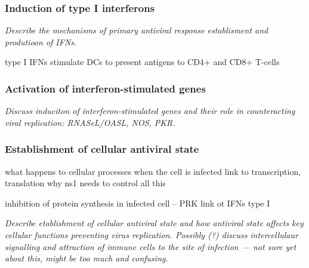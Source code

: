 		\subsubsection{Induction of type I interferons}
		
		\textit{Describe the mechanisms of primary antiviral response establisment and produtioon of IFNs.}
		
		type I IFNs stimulate DCs to present antigens to CD4+ and CD8+ T-cells
		
		\subsubsection{Activation of interferon-stimulated genes}
		
		\textit{Discuss induciton of interferon-stimulated genes and their role in counteracting viral replication: RNASeL/OASL, NOS, PKR.}
		
		
		\subsubsection{Establishment of cellular antiviral state}
		
		what happens to cellular processes when the cell is infected
		link to transcription, translation 
		why ns1 needs to control all this
		
	
		inhibition of protein synthesis in infected cell -- PRK link ot IFNs type I
		
		\textit{Describe etablishment of cellular antiviral state and how antiviral state affects key cellular functions preventing virus replication. Possibly (?) discuss intercellulaur signalling and attraction of immune cells to the site of infection --- not sure yet about this, might be too much and confusing.}
		
